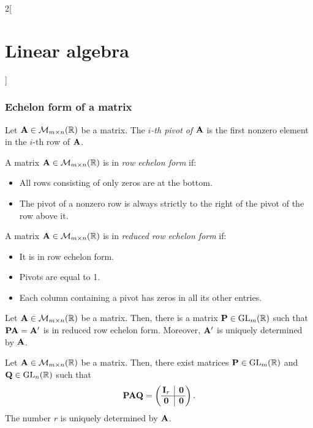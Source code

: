 \documentclass[../../../main.tex]{subfiles}
\begin{document}
\begin{multicols}{2}[\section{Linear algebra}]
  \subsubsection*{Echelon form of a matrix}
  \begin{definition}
    Let $\vb{A}\in\mathcal{M}_{m\times n}(\mathbb{R})$ be a matrix. The \textit{$i$-th pivot of $\vb{A}$} is the first nonzero element in the $i$-th row of $\vb{A}$.
  \end{definition}
  \begin{definition}
    A matrix $\vb{A}\in\mathcal{M}_{m\times n}(\mathbb{R})$ is in \textit{row echelon form} if:
    \begin{itemize}
      \item All rows consisting of only zeros are at the bottom.
      \item The pivot of a nonzero row is always strictly to the right of the pivot of the row above it.
    \end{itemize}
  \end{definition}
  \begin{definition}
    A matrix $\vb{A}\in\mathcal{M}_{m\times n}(\mathbb{R})$ is in \textit{reduced row echelon form} if:
    \begin{itemize}
      \item It is in row echelon form.
      \item Pivots are equal to 1.
      \item Each column containing a pivot has zeros in all its other entries.
    \end{itemize}
  \end{definition}
  \begin{theorem}
    Let $\vb{A}\in\mathcal{M}_{m\times n}(\mathbb{R})$ be a matrix. Then, there is a matrix $\vb{P}\in\mathrm{GL}_m(\mathbb{R})$ such that $\vb{P}\vb{A}=\vb{A'}$ is in reduced row echelon form. Moreover, $\vb{A'}$ is uniquely determined by $\vb{A}$.
  \end{theorem}
  \begin{theorem}
    Let $\vb{A}\in\mathcal{M}_{m\times n}(\mathbb{R})$ be a matrix. Then, there exist matrices $\vb{P}\in\mathrm{GL}_m(\mathbb{R})$ and $\vb{Q}\in\mathrm{GL}_n(\mathbb{R})$ such that
    $$\mathblack{P}\mathblack{A}\mathblack{Q}=\left(
      \begin{array}{@{\,} c|c @{\,}}
          \mathblack{I}_r & \mathblack{0} \\
          \hline
          \mathblack{0}   & \mathblack{0}
        \end{array}
      \right).$$
    The number $r$ is uniquely determined by $\vb{A}$.
  \end{theorem}

\end{multicols}
\end{document}
